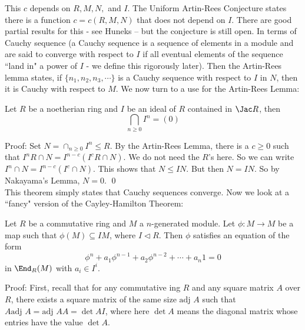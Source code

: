 This $c$ depends on $R,M,N,$ and $I$. The Uniform Artin-Rees Conjecture states there is a function $c=c(R,M,N)$ that does not depend on $I$. There are good partial results for this - see Huneks -- but the conjecture is still open. In terms of Cauchy sequence (a Cauchy sequence is a sequence of elements in a module and are said to converge with respect to $I$ if all eventual elements of the sequence ``land in" a power of $I$ - we define this rigorously later). Then the Artin-Rees lemma states, if $\{n_1,n_2,n_3,\cdots\}$ is a Cauchy sequence with respect to $I$ in $N$, then it is Cauchy with respect to $M$. We now turn to a use for the Artin-Rees Lemma:

\begin{thmm}
Let $R$ be a noetherian ring and $I$ be an ideal of $R$ contained in $\Jac R$, then 
\[
\bigcap_{n \geq 0} I^n=(0)
\]
\end{thmm}

\noindent Proof: Set $N=\cap_{n \geq 0} I^n \leq R$. By the Artin-Rees Lemma, there is a $c \geq 0$ such that $I^nR \cap N=I^{n-c}(I^cR \cap N)$. We do not need the $R$'s here. So we can write $I^n \cap N=I^{n-c}(I^c \cap N)$. This shows that $N \leq IN$. But then $N=IN$. So by Nakayama's Lemma, $N=0$. \qed \\

This theorem simply states that Cauchy sequences converge. Now we look at a ``fancy" version of the Cayley-Hamilton Theorem:

\begin{thmm}
Let $R$ be a commutative ring and $M$ a $n$-generated module. Let $\phi: M \to M$ be a map such that $\phi(M) \subseteq IM$, where $I \lhd R$. Then $\phi$ satisfies an equation of the form
\[
\phi^n+a_1\phi^{n-1}+a_2\phi^{n-2}+\cdots+a_n 1=0
\]
in $\End_R(M)$ with $a_i \in I^i$. 
\end{thmm}

\noindent Proof: First, recall that for any commutative ing $R$ and any square matrix $A$ over $R$, there exists a square matrix of the same size $\text{adj } A$ such that $A\text{adj }A=\text{adj }AA=\det A I$, where here $\det A$ means the diagonal matrix whose entries have the value $\det A$. 

